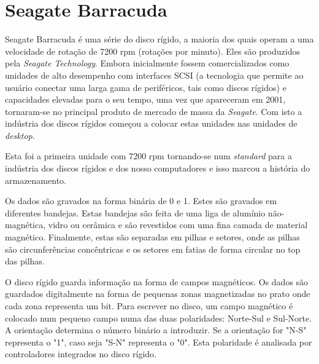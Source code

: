 \documentclass{report}
\begin{document}
\newpage

	\section{Seagate Barracuda}

	Seagate Barracuda é uma série do disco rígido, a maioria dos quais operam a uma velocidade de rotação de 7200 rpm (rotações por minuto). Eles são produzidos pela \textit{Seagate Technology}. Embora inicialmente fossem comercializados como unidades de alto desempenho com interfaces SCSI (a tecnologia que permite ao usuário conectar uma larga gama de periféricos, tais como discos rígidos) e capacidades elevadas para o seu tempo, uma vez que apareceram em 2001, tornaram-se no principal produto de mercado de massa da \textit{Seagate}. Com isto a indústria dos discos rígidos começou a colocar estas unidades nas unidades de \textit{desktop}.
\vspace{1mm}

	Esta foi a primeira unidade com 7200 rpm tornando-se num \textit{standard} para a indústria dos discos rígidos e dos nosso computadores e isso marcou a história do armazenamento.
\vspace{1mm}
	
	Os dados são gravados na forma binária de 0 e 1. Estes são gravados em diferentes bandejas. Estas bandejas são feita de uma liga de alumínio não-magnética, vidro ou cerâmica e são revestidos com uma fina camada de material magnético. Finalmente, estas são separadas em pilhas e setores, onde as pilhas são circunferências concêntricas e os setores em fatias de forma circular no top das pilhas.
\vspace{1mm}
	
	O disco rígido guarda informação na forma de campos magnéticos. Os dados são guardados digitalmente na forma de pequenas zonas magnetizadas no prato onde cada zona representa um bit. Para escrever no disco, um campo magnético é colocado num pequeno campo numa das duas polaridades: Norte-Sul e Sul-Norte. A orientação determina o número binário a introduzir. Se a orientação for "N-S" representa o "1", caso seja "S-N" representa o "0". Esta polaridade é analisada por controladores integrados no disco rígido.
\vspace{1mm}
\end{document}
